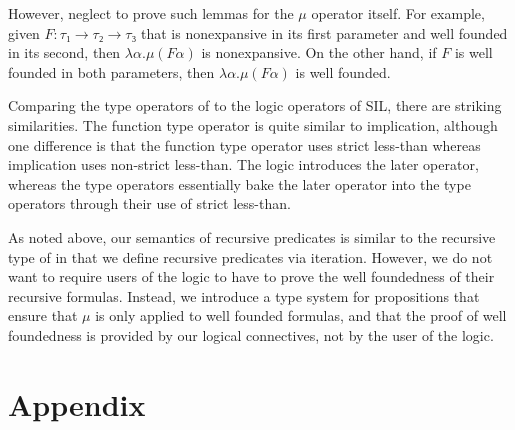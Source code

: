 \documentclass[acmsmall]{acmart}
\begin{document}
However, \citet{Appel:2001aa} neglect to prove such lemmas for the $μ$
operator itself. For example, given $F : τ₁ → τ₂ → τ₃$ that is
nonexpansive in its first parameter and well founded in its second,
then $λ α. μ (F α)$ is nonexpansive.  On the other hand, if $F$ is
well founded in both parameters, then $λ α. μ (F α)$ is well founded.

Comparing the type operators of \citet{Appel:2001aa} to the logic
operators of SIL, there are striking similarities. The function type
operator is quite similar to implication, although one difference is
that the function type operator uses strict less-than whereas
implication uses non-strict less-than. The logic introduces the later
operator, whereas the type operators essentially bake the later
operator into the type operators through their use of strict
less-than.

As noted above, our semantics of recursive predicates is similar to
the recursive type of \citet{Appel:2001aa} in that we define recursive
predicates via iteration.
%
However, we do not want to require users of the logic to have to prove
the well foundedness of their recursive formulas.  Instead, we
introduce a type system for propositions that ensure that $μ$ is only
applied to well founded formulas, and that the proof of well
foundedness is provided by our logical connectives, not by the user of
the logic.











\section*{Appendix}


\end{document}
